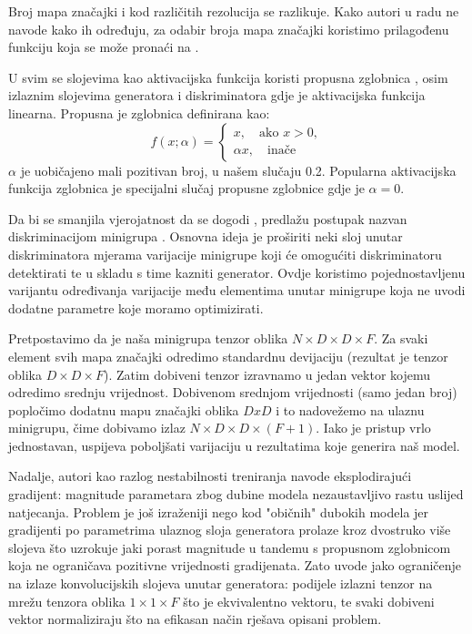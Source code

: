 Broj mapa značajki i kod različitih rezolucija se razlikuje. Kako autori  u radu ne navode kako ih određuju, za odabir broja mapa značajki koristimo prilagođenu funkciju koja se može pronaći na .

U svim se slojevima kao aktivacijska funkcija koristi propusna zglobnica , osim izlaznim slojevima generatora i diskriminatora gdje je aktivacijska funkcija linearna. Propusna je zglobnica definirana kao:
\begin{equation*}
f(x; \alpha) = 
	\begin{cases}
		x, \quad \text{ako } x > 0,\\
		\alpha x, \quad \text{inače} 
	\end{cases}
\end{equation*}
$\alpha$ je uobičajeno mali pozitivan broj, u našem slučaju 0.2. Popularna aktivacijska funkcija zglobnica  je specijalni slučaj propusne zglobnice gdje je $\alpha = 0$.

Da bi se smanjila vjerojatnost da se dogodi ,  predlažu postupak nazvan diskriminacijom minigrupa . Osnovna ideja je proširiti neki sloj unutar diskriminatora mjerama varijacije minigrupe koji će omogućiti diskriminatoru detektirati  te u skladu s time kazniti generator. Ovdje koristimo pojednostavljenu varijantu određivanja varijacije među elementima unutar minigrupe koja ne uvodi dodatne parametre koje moramo optimizirati.

Pretpostavimo da je naša minigrupa tenzor oblika $N \times D \times D \times F$. Za svaki element svih mapa značajki odredimo standardnu devijaciju (rezultat je tenzor oblika $D \times D \times F$). Zatim dobiveni tenzor izravnamo u jedan vektor kojemu odredimo srednju vrijednost. Dobivenom srednjom vrijednosti (samo jedan broj) popločimo dodatnu mapu značajki oblika $D x D$ i to nadovežemo na ulaznu minigrupu, čime dobivamo izlaz $N \times D \times D \times (F + 1)$. Iako je pristup vrlo jednostavan, uspijeva poboljšati varijaciju u rezultatima koje generira naš model.

Nadalje, autori kao razlog nestabilnosti treniranja navode eksplodirajući gradijent: magnitude parametara zbog dubine modela nezaustavljivo rastu uslijed natjecanja. Problem je još izraženiji nego kod "običnih" dubokih modela jer gradijenti po parametrima ulaznog sloja generatora prolaze kroz dvostruko više slojeva što uzrokuje jaki porast magnitude u tandemu s propusnom zglobnicom koja ne ograničava pozitivne vrijednosti gradijenata. Zato uvode jako ograničenje na izlaze konvolucijskih slojeva unutar generatora: podijele izlazni tenzor na mrežu tenzora oblika $1 \times 1 \times F$ što je ekvivalentno vektoru, te svaki dobiveni vektor normaliziraju što na efikasan način rješava opisani problem.

